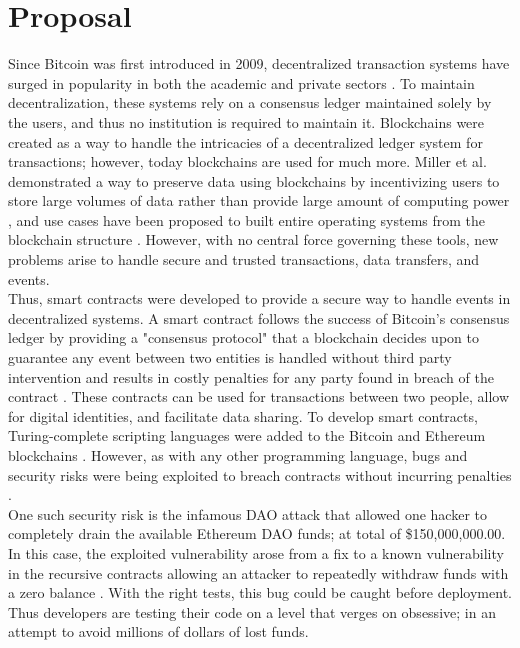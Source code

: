 \section{Proposal}

Since Bitcoin was first introduced in 2009, decentralized transaction systems have surged in popularity in both the academic and private sectors \cite{nakamoto2008bitcoin}. To maintain decentralization, these systems rely on a consensus ledger maintained solely by the users, and thus no institution is required to maintain it. Blockchains were created as a way to handle the intricacies of a decentralized ledger system for transactions; however, today blockchains are used for much more. Miller et al. demonstrated a way to preserve data using blockchains by incentivizing users to store large volumes of data rather than provide large amount of computing power \cite{miller2014permacoin}, and use cases have been proposed to built entire operating systems from the blockchain structure \cite{factombos,tapscott2016blockchain}. However, with no central force governing these tools, new problems arise to handle secure and trusted transactions, data transfers, and events. \\


Thus, smart contracts were developed to provide a secure way to handle events in decentralized systems. A smart contract follows the success of Bitcoin's consensus ledger by providing a "consensus protocol" that a blockchain decides upon to guarantee any event between two entities is handled without third party intervention and results in costly penalties for any party found in breach of the contract \cite{szabo1997idea, luu2016making}. These contracts can be used for transactions between two people, allow for digital identities, and facilitate data sharing. To develop smart contracts, Turing-complete scripting languages were added to the Bitcoin and Ethereum blockchains \cite{buterin2014next, christidis2016blockchains, rosa2017bitcoinscript}. However, as with any other programming language, bugs and security risks were being exploited to breach contracts without incurring penalties \cite{dika2017ethereum}. \\


One such security risk is the infamous DAO attack that allowed one hacker to completely drain the available Ethereum DAO funds; at total of \$150,000,000.00. In this case, the exploited vulnerability arose from a fix to a known vulnerability in the recursive contracts allowing an attacker to repeatedly withdraw funds with a zero balance \cite{daian2016dao}. With the right tests, this bug could be caught before deployment. Thus developers are testing their code on a level that verges on obsessive; in an attempt to avoid millions of dollars of lost funds. \\


